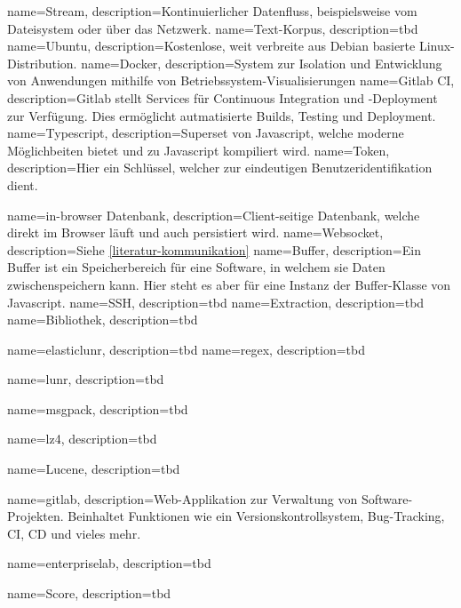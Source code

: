 {
    name=Stream,
    description={Kontinuierlicher Datenfluss, beispielsweise vom Dateisystem oder über das Netzwerk.}
}
{
    name=Text-Korpus,
    description={tbd}
}
{
    name=Ubuntu,
    description={Kostenlose, weit verbreite aus Debian basierte Linux-Distribution.}
}
{
    name=Docker,
    description={System zur Isolation und Entwicklung von Anwendungen mithilfe von Betriebssystem-Visualisierungen}
}
{
    name=Gitlab CI,
    description={Gitlab stellt Services für Continuous Integration und -Deployment zur Verfügung. Dies ermöglicht autmatisierte Builds, Testing und Deployment.}
}
{
    name=Typescript,
    description={Superset von Javascript, welche moderne Möglichbeiten bietet und zu Javascript kompiliert wird.}
}
{
    name=Token,
    description={Hier ein Schlüssel, welcher zur eindeutigen Benutzeridentifikation dient.}
}

{
    name=in-browser Datenbank,
    description={Client-seitige Datenbank, welche direkt im Browser läuft und auch persistiert wird.}
}
{
    name=Websocket,
    description={Siehe \autoref{literatur-kommunikation}}
}
{
    name=Buffer,
    description={Ein Buffer ist ein Speicherbereich für eine Software, in welchem sie Daten zwischenspeichern kann. Hier steht es aber für eine Instanz der Buffer-Klasse von Javascript.}
}
{
    name=SSH,
    description={tbd}
}
{
    name=Extraction,
    description={tbd}
}
{
    name=Bibliothek,
    description={tbd}
}

{
    name=elasticlunr,
    description={tbd}
}
{
    name=regex,
    description={tbd}
}

{
    name=lunr,
    description={tbd}
}

{
    name=msgpack,
    description={tbd}
}

{
    name=lz4,
    description={tbd}
}

{
    name=Lucene,
    description={tbd}
}

{
    name=gitlab,
    description={Web-Applikation zur Verwaltung von Software-Projekten. Beinhaltet Funktionen wie ein Versionskontrollsystem, Bug-Tracking, CI, CD und vieles mehr.}
}

{
    name=enterpriselab,
    description={tbd}
}

{
    name=Score,
    description={tbd}
}

\renewcommand{\glstextformat}[1]{\textbf{\itshape #1}}




